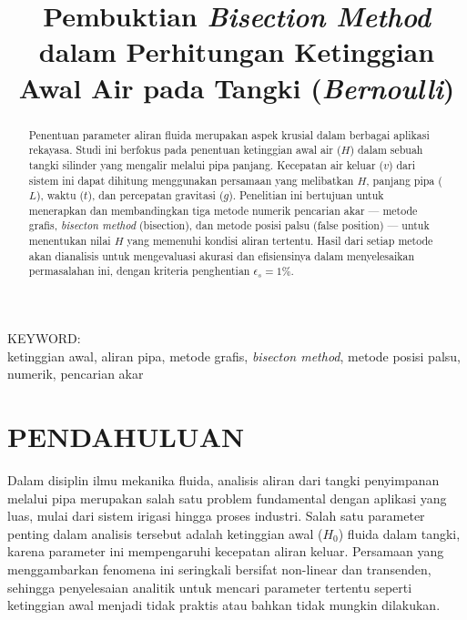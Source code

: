\documentclass[conference]{IEEEtran}
\begin{document}
\title{\textbf{Pembuktian \textit{Bisection Method} dalam Perhitungan Ketinggian Awal Air pada Tangki (\textit{Bernoulli})}}

\author{
}

\maketitle

\begin{abstract}
Penentuan parameter aliran fluida merupakan aspek krusial dalam berbagai aplikasi rekayasa. Studi ini berfokus pada penentuan ketinggian awal air ($H$) dalam sebuah tangki silinder yang mengalir melalui pipa panjang. Kecepatan air keluar ($v$) dari sistem ini dapat dihitung menggunakan persamaan yang melibatkan $H$, panjang pipa ($L$), waktu ($t$), dan percepatan gravitasi ($g$). Penelitian ini bertujuan untuk menerapkan dan membandingkan tiga metode numerik pencarian akar — metode grafis, \textit{bisecton method} (bisection), dan metode posisi palsu (false position) — untuk menentukan nilai $H$ yang memenuhi kondisi aliran tertentu. Hasil dari setiap metode akan dianalisis untuk mengevaluasi akurasi dan efisiensinya dalam menyelesaikan permasalahan ini, dengan kriteria penghentian $\epsilon_s = 1\%$.
\end{abstract}

\begin{IEEEkeywords}
KEYWORD: \\
ketinggian awal, aliran pipa, metode grafis, \textit{bisecton method}, metode posisi palsu, numerik, pencarian akar
\end{IEEEkeywords}

\section{PENDAHULUAN}

Dalam disiplin ilmu mekanika fluida, analisis aliran dari tangki penyimpanan melalui pipa merupakan salah satu problem fundamental dengan aplikasi yang luas, mulai dari sistem irigasi hingga proses industri. Salah satu parameter penting dalam analisis tersebut adalah ketinggian awal ($H_0$) fluida dalam tangki, karena parameter ini mempengaruhi kecepatan aliran keluar. Persamaan yang menggambarkan fenomena ini seringkali bersifat non-linear dan transenden, sehingga penyelesaian analitik untuk mencari parameter tertentu seperti ketinggian awal menjadi tidak praktis atau bahkan tidak mungkin dilakukan.
\end{document}
